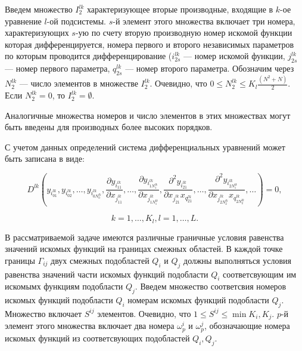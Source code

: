 \documentclass[a4paper,12pt]{article}
\begin{document}
  Введем множество $I_2^{lk}$ характеризующее вторые производные,
  входящие в $k$-ое уравнение $l$-ой подсистемы. $s$-й элемент этого
  множества включает три номера, характеризующих $s$-ую по счету
  вторую производную номер искомой функции которая дифференцируется,
  номера первого и второго независимых параметров по которым
  проводится дифференцирование ($i^{lk}_{2s}$ --- номер искомой
  функции, $j^{lk}_{2s}$ --- номер первого параметра, $q^{lk}_{2s}$
  --- номер второго параметра.  Обозначим через $N_{2}^{lk}$ --- число
  элементов в множестве $I_{2}^{lk}$. Очевидно, что $0 \le N_{2}^{lk}
  \le K_l \frac{(N^2+N)}{2}$.  Если $N_{2}^{lk} = 0$, то $I_{2}^{lk} =
  \emptyset$.

  Аналогичные множества номеров и число элементов в этих множествах
  могут быть введены для производных более высоких порядков.

  С учетом данных определений система дифференциальных уравнений может
  быть записана в виде:
  

  \begin{equation}
    \label{pdegen}
    D^{lk} (
    y_{i^{lk}_{01}}, y_{i^{lk}_{02}}, \ldots,y_{i^{lk}_{0N^{lk}_0}},
    \frac{\partial y_{i^{lk}_{11}}}{\partial x_{j^{lk}_{11}}},\ldots,
    \frac{\partial y_{i^{lk}_{1N^{lk}_1}}}{\partial x_{j^{lk}_{1N^{lk}_1}}},
    \frac{\partial^2 y_{i^{lk}_{21}}}{\partial x_{j^{lk}_{21}}x_{q^{lk}_{21}}},\ldots,
    \frac{\partial^2 y_{i^{lk}_{2N^{lk}_1}}}{\partial x_{j^{lk}_{2N^{lk}_2}}x_{q^{lk}_{2N^{lk}_2}}},
    \ldots) = 0,
  \end{equation}

  \begin{equation*}
    k = 1,\ldots,K_l,l = 1,\ldots,L.
  \end{equation*}  

  В рассматриваемой задаче имеются различные граничные условия
  равенства значений искомых функций на границах смежных областей.  В
  каждой точке границы $\Gamma_{ij}$ двух смежных подобластей $Q_i$ и
  $Q_j$ должны выполняться условия равенства значений части искомых
  функций подобласти $Q_i$ соответсвующим им искомымх функциям
  подобласти $Q_j$. Введем множество соответсвия номеров искомых
  функций подобласти $Q_i$ номерам искомых функций подобласти
  $Q_j$. Множество включает $S^{ij}$ элементов. Очевидно, что $1 \le
  S^{ij} \le \min{K_i, K_j}$.  $p$-й элемент этого множества включает
  два номера $\omega_p^i$ и $\omega_p^j$, обозначающие номера искомых
  функций из соответсвующих подобластей $Q_i,Q_j$.
\end{document}
